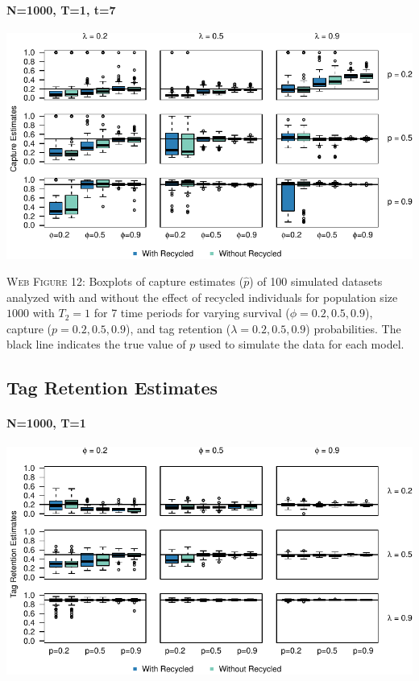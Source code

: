 \documentclass[]{article}
\let\oldparagraph\paragraph
\renewcommand{\paragraph}[1]{\oldparagraph{#1}\mbox{}}
\begin{document}
\paragraph{N=1000, T=1, t=7}\label{n1000-t1-t7-1}

\includegraphics{Appendix_files/figure-latex/figure12_capture_GJSTL6-1.pdf}

\textsc{Web Figure 12:} Boxplots of capture estimates (\(\hat{p}\)) of
100 simulated datasets analyzed with and without the effect of recycled
individuals for population size \(1000\) with \(T_2=1\) for 7 time
periods for varying survival (\(\phi=0.2,0.5,0.9\)), capture
(\(p=0.2,0.5,0.9\)), and tag retention (\(\lambda=0.2,0.5,0.9\))
probabilities. The black line indicates the true value of \(p\) used to
simulate the data for each model.

\newpage

\subsection{Tag Retention Estimates}\label{tag-retention-estimates}

\paragraph{N=1000, T=1}\label{n1000-t1-2}

\includegraphics{Appendix_files/figure-latex/figure13_tagretention_GJSTL1-1.pdf}
\end{document}

